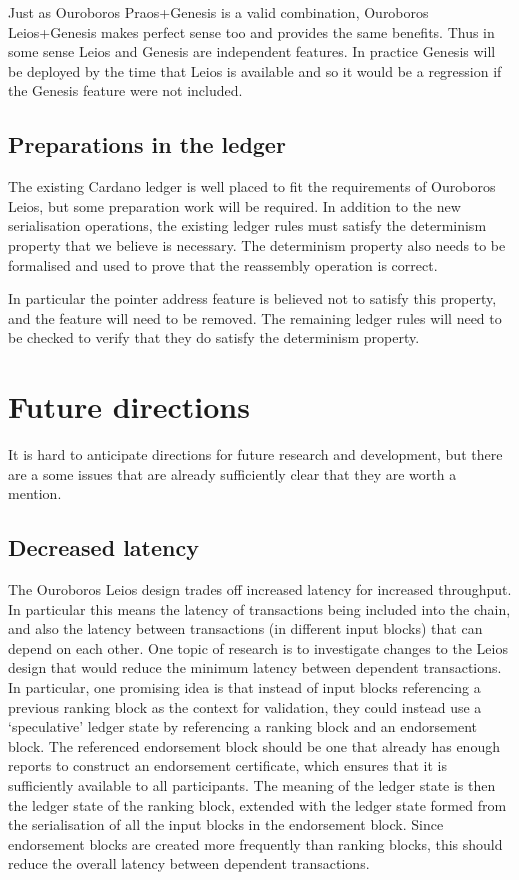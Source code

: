 \documentclass[11pt,a4paper]{article}
\begin{document}
Just as Ouroboros Praos+Genesis is a valid combination, Ouroboros Leios+Genesis
makes perfect sense too and provides the same benefits. Thus in some sense
Leios and Genesis are independent features. In practice Genesis will be
deployed by the time that Leios is available and so it would be a regression if
the Genesis feature were not included.

\subsection{Preparations in the ledger}
The existing Cardano ledger is well placed to fit the requirements of Ouroboros
Leios, but some preparation work will be required. In addition to the new
serialisation operations, the existing ledger rules must satisfy the
determinism property that we believe is necessary. The determinism property
also needs to be formalised and used to prove that the reassembly operation is
correct.

In particular the pointer address feature is believed not to satisfy this
property, and the feature will need to be removed. The remaining ledger rules
will need to be checked to verify that they do satisfy the determinism property.

\section{Future directions}

It is hard to anticipate directions for future research and development, but
there are a some issues that are already sufficiently clear that they are worth
a mention.

\subsection{Decreased latency}

The Ouroboros Leios design trades off increased latency for increased
throughput. In particular this means the latency of transactions being included
into the chain, and also the latency between transactions (in different input
blocks) that can depend on each other. One topic of research is to investigate
changes to the Leios design that would reduce the minimum latency between
dependent transactions. In particular, one promising idea is that instead of
input blocks referencing a previous ranking block as the context for validation,
they could instead use a `speculative' ledger state by referencing a ranking
block and an endorsement block. The referenced endorsement block should be one
that already has enough reports to construct an endorsement certificate, which
ensures that it is sufficiently available to all participants. The meaning of
the ledger state is then the ledger state of the ranking block, extended with
the ledger state formed from the serialisation of all the input blocks in the
endorsement block. Since endorsement blocks are created more frequently than
ranking blocks, this should reduce the overall latency between dependent
transactions.
\end{document}
